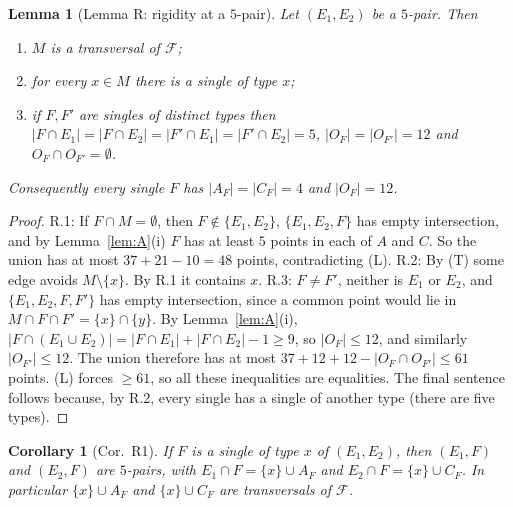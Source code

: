 \documentclass[11pt]{amsart}
\newtheorem{lemma}[theorem]{Lemma}
\newtheorem{corollary}[theorem]{Corollary}
\theoremstyle{definition}
\newcommand{\cF}{\mathcal{F}}
\begin{document}
\begin{lemma}[Lemma R: rigidity at a $5$-pair]\label{lem:R}
Let $(E_1,E_2)$ be a $5$-pair. Then
\begin{enumerate}[label=\textup{R.\arabic*}]
\item\label{R1} $M$ is a transversal of $\cF$;
\item\label{R2} for every $x\in M$ there is a single of type $x$;
\item\label{R3} if $F,F'$ are singles of distinct types then $|F\cap E_1|=|F\cap E_2|=|F'\cap E_1|=|F'\cap E_2|=5$, $|O_F|=|O_{F'}|=12$ and $O_F\cap O_{F'}=\emptyset$.
\end{enumerate}
Consequently every single $F$ has $|A_F|=|C_F|=4$ and $|O_F|=12$.
\end{lemma}
\begin{proof}
R.1: If $F\cap M=\emptyset$, then $F\notin\{E_1,E_2\}$, $\{E_1,E_2,F\}$ has empty intersection, and by Lemma~\ref{lem:A}(i) $F$ has at least $5$ points in each of $A$ and $C$. So the union has at most $37+21-10=48$ points, contradicting (L).
R.2: By (T) some edge avoids $M\setminus\{x\}$. By R.1 it contains $x$.
R.3: $F\ne F'$, neither is $E_1$ or $E_2$, and $\{E_1,E_2,F,F'\}$ has empty intersection, since a common point would lie in $M\cap F\cap F'=\{x\}\cap\{y\}$. By Lemma~\ref{lem:A}(i), $|F\cap(E_1\cup E_2)|=|F\cap E_1|+|F\cap E_2|-1\ge 9$, so $|O_F|\le 12$, and similarly $|O_{F'}|\le 12$. The union therefore has at most $37+12+12-|O_F\cap O_{F'}|\le 61$ points. (L) forces $\ge 61$, so all these inequalities are equalities. The final sentence follows because, by R.2, every single has a single of another type (there are five types).
\end{proof}

\begin{corollary}[Cor.~R1]\label{cor:R1}
If $F$ is a single of type $x$ of $(E_1,E_2)$, then $(E_1,F)$ and $(E_2,F)$ are $5$-pairs, with $E_1\cap F=\{x\}\cup A_F$ and $E_2\cap F=\{x\}\cup C_F$. In particular $\{x\}\cup A_F$ and $\{x\}\cup C_F$ are transversals of $\cF$.
\end{corollary}
\end{document}
